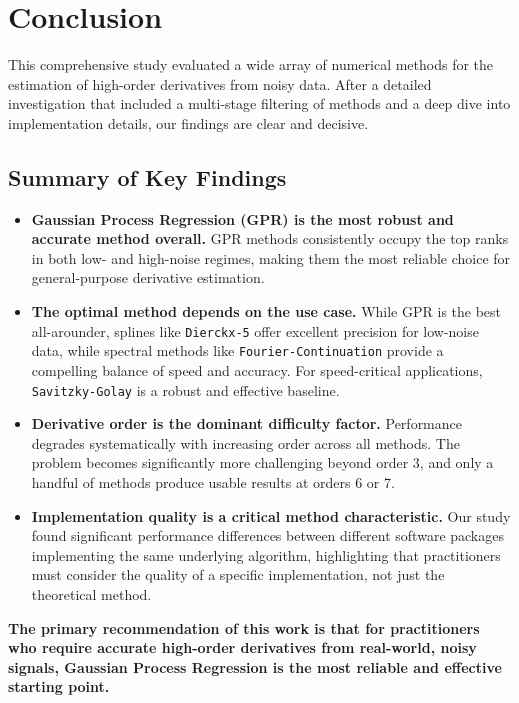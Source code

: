 \section{Conclusion}
\label{sec:conclusion}

This comprehensive study evaluated a wide array of numerical methods for the estimation of high-order derivatives from noisy data. After a detailed investigation that included a multi-stage filtering of methods and a deep dive into implementation details, our findings are clear and decisive.

\subsection{Summary of Key Findings}

\begin{itemize}
    \item \textbf{Gaussian Process Regression (GPR) is the most robust and accurate method overall.} GPR methods consistently occupy the top ranks in both low- and high-noise regimes, making them the most reliable choice for general-purpose derivative estimation.
    \item \textbf{The optimal method depends on the use case.} While GPR is the best all-arounder, splines like \texttt{Dierckx-5} offer excellent precision for low-noise data, while spectral methods like \texttt{Fourier-Continuation} provide a compelling balance of speed and accuracy. For speed-critical applications, \texttt{Savitzky-Golay} is a robust and effective baseline.
    \item \textbf{Derivative order is the dominant difficulty factor.} Performance degrades systematically with increasing order across all methods. The problem becomes significantly more challenging beyond order 3, and only a handful of methods produce usable results at orders 6 or 7.
    \item \textbf{Implementation quality is a critical method characteristic.} Our study found significant performance differences between different software packages implementing the same underlying algorithm, highlighting that practitioners must consider the quality of a specific implementation, not just the theoretical method.
\end{itemize}

\textbf{The primary recommendation of this work is that for practitioners who require accurate high-order derivatives from real-world, noisy signals, Gaussian Process Regression is the most reliable and effective starting point.}

